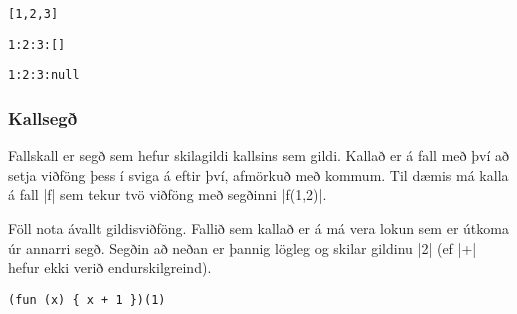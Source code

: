 \documentclass[12pt]{article}
\begin{document}
\null\hfill%
\begin{minipage}{0.333\textwidth + 1pt}
\begin{mdframed}[style=langframe]
\begin{Verbatim}[commandchars=\\?!,codes={\catcode`$=3\catcode`^=7}]
[1,2,3]
\end{Verbatim}
\end{mdframed}
\end{minipage}%
\hspace*{-2pt}%
\begin{minipage}{0.333\textwidth + 1pt}
\begin{mdframed}[style=langframe]
\begin{Verbatim}[commandchars=\\?!,codes={\catcode`$=3\catcode`^=7}]
1:2:3:[]
\end{Verbatim}
\end{mdframed}
\end{minipage}%
\hspace*{-2pt}%
\begin{minipage}{0.333\textwidth + 1pt}
\begin{mdframed}[style=langframe]
\begin{Verbatim}[commandchars=\\?!,codes={\catcode`$=3\catcode`^=7}]
1:2:3:null
\end{Verbatim}
\end{mdframed}
\end{minipage}%
\hfill\null
\bigskip

\subsubsection{Kallsegð}
Fallskall er segð sem hefur skilagildi kallsins sem gildi.
Kallað er á fall með því að setja viðföng þess í sviga á eftir því,
afmörkuð með kommum. Til dæmis má kalla á fall |f| sem tekur tvö viðföng
með segðinni |f(1,2)|.

Föll nota ávallt gildisviðföng.
Fallið sem kallað er á má vera lokun sem er útkoma úr annarri segð.
Segðin að neðan er þannig lögleg og skilar gildinu |2|
(ef |+| hefur ekki verið endurskilgreind).

\begin{mdframed}[style=langframe]
\begin{Verbatim}[commandchars=\\?!,codes={\catcode`$=3\catcode`^=7}]
(fun (x) { x + 1 })(1)
\end{Verbatim}
\end{mdframed}
\end{document}
